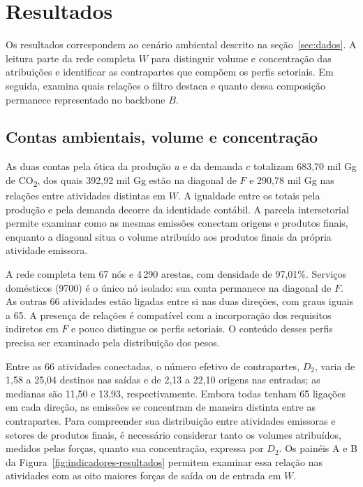 \section{Resultados}
\label{sec:resultados}

Os resultados correspondem ao cenário ambiental descrito na seção~\ref{sec:dados}. A leitura parte da rede completa $W$ para distinguir volume e concentração das atribuições e identificar as contrapartes que compõem os perfis setoriais. Em seguida, examina quais relações o filtro destaca e quanto dessa composição permanece representado no backbone $B$.

\subsection{Contas ambientais, volume e concentração}

As duas contas pela ótica da produção $u$ e da demanda $c$ totalizam 683,70 mil Gg de CO\textsubscript{2}, dos quais 392,92 mil Gg estão na diagonal de $F$ e 290,78 mil Gg nas relações entre atividades distintas em $W$. A igualdade entre os totais pela produção e pela demanda decorre da identidade contábil. A parcela intersetorial permite examinar como as mesmas emissões conectam origens e produtos finais, enquanto a diagonal situa o volume atribuído aos produtos finais da própria atividade emissora.

A rede completa tem 67 nós e 4\,290 arestas, com densidade de 97,01\%. Serviços domésticos (9700) é o único nó isolado: sua conta permanece na diagonal de $F$. As outras 66 atividades estão ligadas entre si nas duas direções, com graus iguais a 65. A presença de relações é compatível com a incorporação dos requisitos indiretos em $F$ e pouco distingue os perfis setoriais. O conteúdo desses perfis precisa ser examinado pela distribuição dos pesos.

Entre as 66 atividades conectadas, o número efetivo de contrapartes, $D_2$, varia de 1,58 a 25,04 destinos nas saídas e de 2,13 a 22,10 origens nas entradas; as medianas são 11,50 e 13,93, respectivamente. Embora todas tenham 65 ligações em cada direção, as emissões se concentram de maneira distinta entre as contrapartes. Para compreender sua distribuição entre atividades emissoras e setores de produtos finais, é necessário considerar tanto os volumes atribuídos, medidos pelas forças, quanto sua concentração, expressa por $D_2$. Os painéis A e B da Figura~\ref{fig:indicadores-resultados} permitem examinar essa relação nas atividades com as oito maiores forças de saída ou de entrada em $W$.

